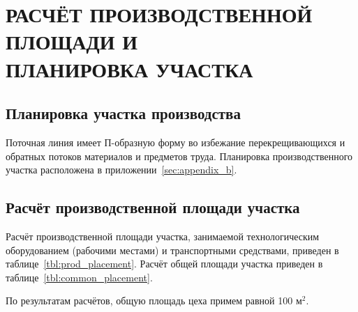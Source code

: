 \section[Расчёт производственной площади и планировка участка]
{РАСЧЁТ ПРОИЗВОДСТВЕННОЙ ПЛОЩАДИ И \\
ПЛАНИРОВКА УЧАСТКА}
\label{sec:placement}

\subsection{Планировка участка производства}

Поточная линия имеет П-образную форму во избежание перекрещивающихся и
обратных потоков материалов и предметов труда.
Планировка производственного участка расположена в приложении~\ref{sec:appendix_b}.

\subsection{Расчёт производственной площади участка}

Расчёт производственной площади участка, занимаемой технологическим оборудованием
(рабочими местами) и транспортными средствами,
приведен в таблице~\ref{tbl:prod_placement}.
Расчёт общей площади участка приведен в таблице~\ref{tbl:common_placement}.

По результатам расчётов, общую площадь цеха примем равной
100 \( \text{м}^2 \).

